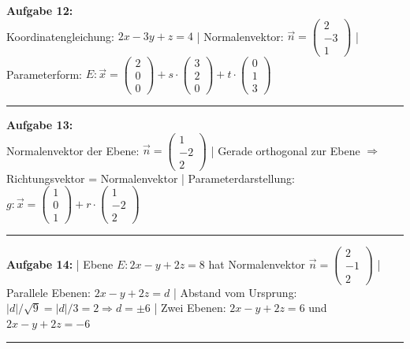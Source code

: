 \documentclass[12pt,a4paper]{article}
\newcommand{\vek}[1]{\vec{#1}}
\begin{document}
\textbf{Aufgabe 12:} \\
Koordinatengleichung: $2x - 3y + z = 4$ |
Normalenvektor: $\vek{n} = \begin{pmatrix}2\\-3\\1\end{pmatrix}$ |
Parameterform: $E: \vek{x} = \begin{pmatrix}2\\0\\0\end{pmatrix} + s \cdot \begin{pmatrix}3\\2\\0\end{pmatrix} + t \cdot \begin{pmatrix}0\\1\\3\end{pmatrix}$
\begin{center}\rule{0.8\linewidth}{0.4pt}\end{center}

\textbf{Aufgabe 13:} \\
Normalenvektor der Ebene: $\vek{n} = \begin{pmatrix}1\\-2\\2\end{pmatrix}$ |
Gerade orthogonal zur Ebene $\Rightarrow$ Richtungsvektor = Normalenvektor |
Parameterdarstellung: $g: \vek{x} = \begin{pmatrix}1\\0\\1\end{pmatrix} + r \cdot \begin{pmatrix}1\\-2\\2\end{pmatrix}$
\begin{center}\rule{0.8\linewidth}{0.4pt}\end{center}

\textbf{Aufgabe 14:} |
Ebene $E: 2x - y + 2z = 8$ hat Normalenvektor $\vek{n} = \begin{pmatrix}2\\-1\\2\end{pmatrix}$ |
Parallele Ebenen: $2x - y + 2z = d$ |
Abstand vom Ursprung: $|d| / \sqrt{9} = |d|/3 = 2 \Rightarrow d = \pm 6$ |
Zwei Ebenen: $2x - y + 2z = 6$ und $2x - y + 2z = -6$
\begin{center}\rule{0.8\linewidth}{0.4pt}\end{center}
\end{document}
